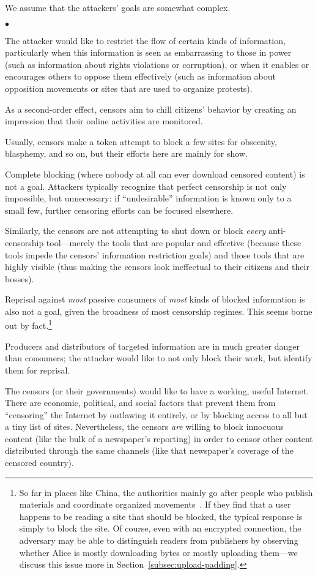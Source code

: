 \documentclass{llncs}
\newenvironment{tightlist}{\begin{list}{$\bullet$}{
  \setlength{\itemsep}{0mm}
    \setlength{\parsep}{0mm}
    }}{\end{list}}
\begin{document}
We assume that the attackers' goals are somewhat complex.
\begin{tightlist}
\item The attacker would like to restrict the flow of certain kinds of
  information, particularly when this information is seen as embarrassing to
  those in power (such as information about rights violations or corruption),
  or when it enables or encourages others to oppose them effectively (such as
  information about opposition movements or sites that are used to organize
  protests).
\item As a second-order effect, censors aim to chill citizens' behavior by
  creating an impression that their online activities are monitored.
\item Usually, censors make a token attempt to block a few sites for
  obscenity, blasphemy, and so on, but their efforts here are mainly for
  show.
\item Complete blocking (where nobody at all can ever download censored
  content) is not a
  goal. Attackers typically recognize that perfect censorship is not only
  impossible, but unnecessary: if ``undesirable'' information is known only
  to a small few, further censoring efforts can be focused elsewhere.
\item Similarly, the censors are not attempting to shut down or block {\it
  every} anti-censorship tool---merely the tools that are popular and
  effective (because these tools impede the censors' information restriction
  goals) and those tools that are highly visible (thus making the censors
  look ineffectual to their citizens and their bosses).
\item Reprisal against {\it most} passive consumers of {\it most} kinds of
  blocked information is also not a goal, given the broadness of most
  censorship regimes. This seems borne out by fact.\footnote{So far in places
  like China, the authorities mainly go after people who publish materials
  and coordinate organized movements~\cite{mackinnon-personal}.
  If they find that a
  user happens to be reading a site that should be blocked, the typical
  response is simply to block the site. Of course, even with an encrypted
  connection, the adversary may be able to distinguish readers from
  publishers by observing whether Alice is mostly downloading bytes or mostly
  uploading them---we discuss this issue more in
  Section~\ref{subsec:upload-padding}.}
\item Producers and distributors of targeted information are in much
  greater danger than consumers; the attacker would like to not only block
  their work, but identify them for reprisal.
\item The censors (or their governments) would like to have a working, useful
  Internet. There are economic, political, and social factors that prevent
  them from ``censoring'' the Internet by outlawing it entirely, or by
  blocking access to all but a tiny list of sites.
  Nevertheless, the censors {\it are} willing to block innocuous content
  (like the bulk of a newspaper's reporting) in order to censor other content
  distributed through the same channels (like that newspaper's coverage of
  the censored country).
\end{tightlist}
\end{document}
